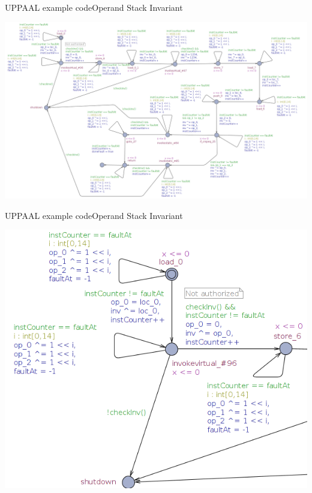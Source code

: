\begin{frame}{UPPAAL example code}{Operand Stack Invariant}
\begin{adjustwidth}{-2cm}{-2cm}
\begin{center}
\includegraphics[scale=0.22]{figures/tinyJCLinvariant.png}
\end{center}
\end{adjustwidth}
\end{frame}

\begin{frame}{UPPAAL example code}{Operand Stack Invariant}
\begin{adjustwidth}{-2cm}{-2cm}
\begin{center}
\includegraphics[scale=0.35]{figures/tinyJCLinvariantexplained.png}
\end{center}
\end{adjustwidth}
\end{frame}

